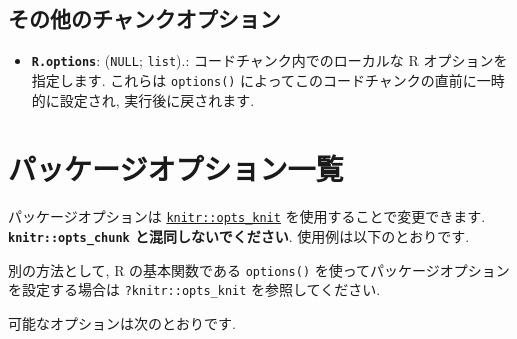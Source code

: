 \documentclass[
]{bxjsreport}
\newenvironment{Shaded}{\begin{snugshade}}{\end{snugshade}}
\newcommand{\AttributeTok}[1]{\textcolor[rgb]{0.77,0.63,0.00}{#1}}
\newcommand{\ConstantTok}[1]{\textcolor[rgb]{0.00,0.00,0.00}{#1}}
\newcommand{\FunctionTok}[1]{\textcolor[rgb]{0.00,0.00,0.00}{#1}}
\newcommand{\NormalTok}[1]{#1}
\newcommand{\SpecialCharTok}[1]{\textcolor[rgb]{0.00,0.00,0.00}{#1}}
\providecommand{\tightlist}{%
  \setlength{\itemsep}{0pt}\setlength{\parskip}{0pt}}
\begin{document}
\hypertarget{ux305dux306eux4ed6ux306eux30c1ux30e3ux30f3ux30afux30aaux30d7ux30b7ux30e7ux30f3}{%
\subsection{その他のチャンクオプション}\label{ux305dux306eux4ed6ux306eux30c1ux30e3ux30f3ux30afux30aaux30d7ux30b7ux30e7ux30f3}}

\begin{itemize}
\tightlist
\item
  \textbf{\texttt{R.options}}: (\texttt{NULL}; \texttt{list}).:
  コードチャンク内でのローカルな R オプションを指定します. これらは
  \texttt{options()} によってこのコードチャンクの直前に一時的に設定され,
  実行後に戻されます.
\end{itemize}

\hypertarget{package-options}{%
\section{パッケージオプション一覧}\label{package-options}}

パッケージオプションは
\protect\hyperlink{objects}{\texttt{knitr::opts\_knit}}
を使用することで変更できます. \textbf{\texttt{knitr::opts\_chunk}
と混同しないでください}. 使用例は以下のとおりです.

\begin{Shaded}
\end{Shaded}

別の方法として, R の基本関数である \texttt{options()}
を使ってパッケージオプションを設定する場合は \texttt{?knitr::opts\_knit}
を参照してください.

可能なオプションは次のとおりです.
\end{document}
